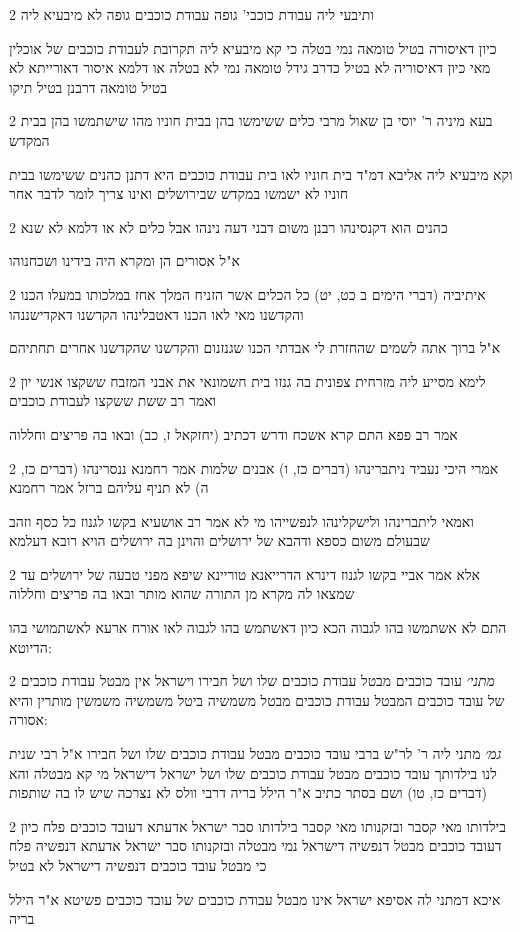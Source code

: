 \documentclass[12pt, openany]{book}
\newcommand{\sethebfont}{
\fontsize{10.5pt}{21.0pt} \selectfont
}
\newcommand{\twocol}[1]{
	{\sethebfont \begin{multicols}{2}
			#1
	\end{multicols}}	
}
\begin{document}
\twocol{ותיבעי ליה עבודת כוכבי' גופה עבודת כוכבים גופה לא מיבעיא ליה
\par כיון דאיסורה בטיל טומאה נמי בטלה כי קא מיבעיא ליה תקרובת לעבודת כוכבים של אוכלין מאי כיון דאיסוריה לא בטיל כדרב גידל טומאה נמי לא בטלה או דלמא איסור דאורייתא לא בטיל טומאה דרבנן בטיל תיקו}
\twocol{בעא מיניה ר' יוסי בן שאול מרבי כלים ששימשו בהן בבית חוניו מהו שישתמשו בהן בבית המקדש
\par וקא מיבעיא ליה אליבא דמ"ד בית חוניו לאו בית עבודת כוכבים היא דתנן כהנים ששימשו בבית חוניו לא ישמשו במקדש שבירושלים ואינו צריך לומר לדבר אחר}
\twocol{כהנים הוא דקנסינהו רבנן משום דבני דעה נינהו אבל כלים לא או דלמא לא שנא
\par א"ל אסורים הן ומקרא היה בידינו ושכחנוהו}
\twocol{איתיביה (דברי הימים ב כט, יט) כל הכלים אשר הזניח המלך אחז במלכותו במעלו הכנו והקדשנו מאי לאו הכנו דאטבלינהו הקדשנו דאקדישננהו
\par א"ל ברוך אתה לשמים שהחזרת לי אבדתי הכנו שגנזנום והקדשנו שהקדשנו אחרים תחתיהם}
\twocol{לימא מסייע ליה מזרחית צפונית בה גנזו בית חשמונאי את אבני המזבח ששקצו אנשי יון ואמר רב ששת ששקצו לעבודת כוכבים
\par אמר רב פפא התם קרא אשכח ודרש דכתיב (יחזקאל ז, כב) ובאו בה פריצים וחללוה}
\twocol{אמרי  היכי נעביד ניתברינהו (דברים כז, ו) אבנים שלמות אמר רחמנא ננסרינהו (דברים כז, ה) לא תניף עליהם ברזל אמר רחמנא
\par ואמאי ליתברינהו ולישקלינהו לנפשייהו מי לא אמר רב אושעיא בקשו לגנוז כל כסף וזהב שבעולם משום כספא ודהבא של ירושלים והוינן בה ירושלים הויא רובא דעלמא}
\twocol{אלא אמר אביי בקשו לגנוז דינרא הדרייאנא טוריינא שיפא מפני טבעה של ירושלים עד שמצאו לה מקרא מן התורה שהוא מותר ובאו בה פריצים וחללוה
\par התם לא אשתמשו בהו לגבוה הכא כיון דאשתמש בהו לגבוה לאו אורח ארעא לאשתמושי בהו הדיוטא:}
\twocol{{\large\emph{מתני׳}} עובד כוכבים מבטל עבודת כוכבים שלו ושל חבירו וישראל אין מבטל עבודת כוכבים של עובד כוכבים המבטל עבודת כוכבים מבטל משמשיה ביטל משמשיה משמשין מותרין והיא אסורה:
\par {\large\emph{גמ׳}} מתני ליה ר' לר"ש ברבי עובד כוכבים מבטל עבודת כוכבים שלו ושל חבירו א"ל רבי שנית לנו בילדותך עובד כוכבים מבטל עבודת כוכבים שלו ושל ישראל דישראל מי קא מבטלה והא (דברים כז, טו) ושם בסתר כתיב א"ר הילל בריה דרבי וולס לא נצרכה שיש לו בה שותפות}
\twocol{בילדותו מאי קסבר ובזקנותו מאי קסבר בילדותו סבר ישראל אדעתא דעובד כוכבים פלח כיון דעובד כוכבים מבטל דנפשיה דישראל נמי מבטלה ובזקנותו סבר ישראל אדעתא דנפשיה פלח כי מבטל עובד כוכבים דנפשיה דישראל לא בטיל
\par איכא דמתני לה אסיפא ישראל אינו מבטל עבודת כוכבים של עובד כוכבים פשיטא א"ר הילל בריה}
\end{document}
